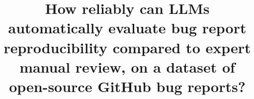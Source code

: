 \documentclass[conference]{IEEEtran}
\begin{document}
\title{ 
 	
How reliably can LLMs automatically evaluate bug report reproducibility compared to expert manual review, on a dataset of open-source GitHub bug reports?}

\author{
}

\maketitle










\nocite{*}


\end{document}
